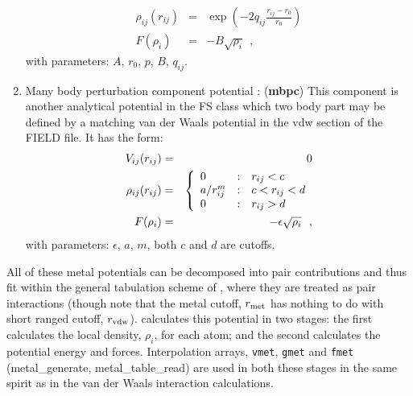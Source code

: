 \begin{enumerate}
\begin{eqnarray}
\rho_{ij}(r_{ij}) &=& \exp \left(-2 q_{ij} \frac{r_{ij}-r_{0}}{r_{0}}\right) \\
F(\rho_{i}) &=& -B \sqrt{\rho_{i}}~~, \nonumber
\end{eqnarray}
with parameters: $A$, $r_{0}$, $p$, $B$, $q_{ij}$.
\item Many body perturbation component potential \cite{cooper-14a}:  ({\bf mbpc})
This component is another analytical potential in the FS class which
two body part may be defined by a matching van der Waals potential in
the vdw section of the FIELD file.  It has the form:
\begin{eqnarray}
V_{ij}(r_{ij}) &=& 0 \nonumber \\
\rho_{ij}(r_{ij}) &=& \left\{ \begin{array} {l@{\quad:\quad}l}
0 & r_{ij} < c \\
a/r_{ij}^{m} & c < r_{ij} < d \\
0 & r_{ij} > d
\end{array} \right. \\
F(\rho_{i}) &=& -\epsilon \sqrt{\rho_{i}}~~, \nonumber
\end{eqnarray}
with parameters: $\epsilon$, $a$, $m$, both $c$ and $d$ are cutoffs.
\end{enumerate}

All of these metal potentials can be decomposed into pair
contributions and thus fit within the general tabulation scheme of \D,
where they are treated as pair interactions (though note that the
metal cutoff, $r_{\rm met}$ has nothing to do with short ranged cutoff,
$r_{\rm vdw}$).  \D calculates this potential in two stages: the first
calculates the local density, $\rho_{i}$, for each atom; and the
second calculates the potential energy and forces.  Interpolation
arrays, {\tt vmet}, {\tt gmet} and {\tt fmet} ({\sc metal\_generate},
{\sc metal\_table\_read}) are used in both these stages in the same
spirit as in the van der Waals interaction calculations.

